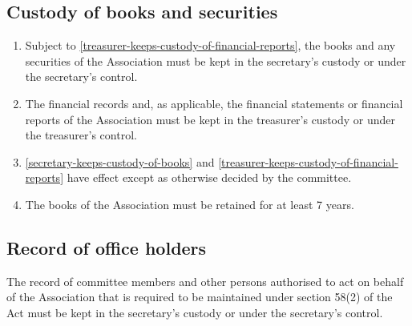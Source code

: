 \documentclass[../constitution.tex]{subfiles}
\begin{document}
\hypertarget{custody-of-books-and-securities}{%
\subsection{Custody of books and securities}\label{custody-of-books-and-securities}}

\begin{enumerate}

\item Subject to  \ref{treasurer-keeps-custody-of-financial-reports}, the books and any securities of the Association must be kept in the secretary's custody or under the secretary's control. \label{secretary-keeps-custody-of-books}
\item The financial records and, as applicable, the financial statements or financial reports of the Association must be kept in the treasurer's custody or under the treasurer's control. \label{treasurer-keeps-custody-of-financial-reports}
\item {} \ref{secretary-keeps-custody-of-books} and \ref{treasurer-keeps-custody-of-financial-reports} have effect except as otherwise decided by the committee.
\item The books of the Association must be retained for at least 7 years.
\end{enumerate}

\hypertarget{record-of-office-holders}{%
\subsection{Record of office holders}\label{record-of-office-holders}}

The record of committee members and other persons authorised to act on behalf of the Association that is required to be maintained under section 58(2) of the Act must be kept in the secretary's custody or under the secretary's control.

\end{document}
